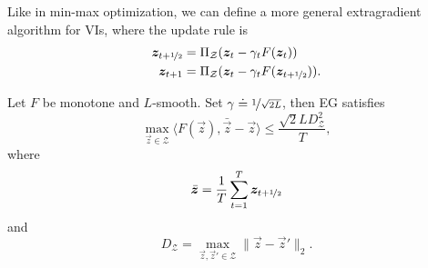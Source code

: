 Like in min-max optimization, we can define a more general extragradient algorithm for VIs, where
the update rule is
\begin{align*}
    \vec{z}_{t+\nicefrac{1}{2}} & = \Pi_{\mathcal{Z}}(\vec{z}_t - \gamma_t F(\vec{z}_t))                    \\
    \vec{z}_{t+1}               & = \Pi_{\mathcal{Z}}(\vec{z}_t - \gamma_t F(\vec{z}_{t+\nicefrac{1}{2}})).
\end{align*}

\begin{theorem}
    Let $F$ be monotone and $L$-smooth. Set $\gamma \doteq \nicefrac{1}{\sqrt{2L}}$, then EG satisfies \[
        \max_{\vec{z} \in \mathcal{Z}} \langle F(\vec{z}), \bar{\vec{z}} - \vec{z} \rangle \leq \frac{\sqrt{2} L D_{\mathcal{Z}}^2}{T},
    \]
    where \[
        \bar{\vec{z}} = \frac{1}{T} \sum_{t=1}^{T} \vec{z}_{t+\nicefrac{1}{2}}
    \]
    and \[
        D_{\mathcal{Z}} = \max_{\vec{z}, \vec{z}' \in \mathcal{Z}} \| \vec{z} - \vec{z}' \|_2.
    \]
\end{theorem}

